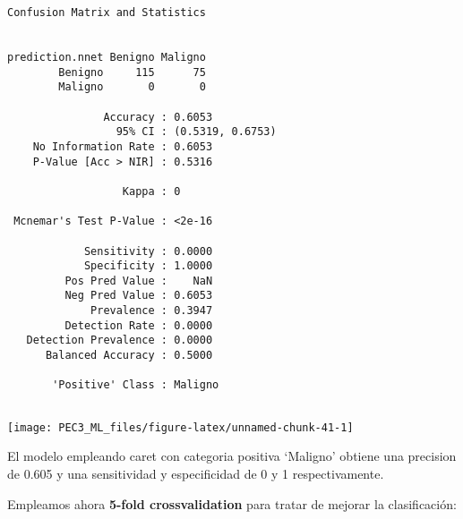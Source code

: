 \documentclass[
]{article}
\begin{document}
\begin{verbatim}
Confusion Matrix and Statistics

               
prediction.nnet Benigno Maligno
        Benigno     115      75
        Maligno       0       0
                                          
               Accuracy : 0.6053          
                 95% CI : (0.5319, 0.6753)
    No Information Rate : 0.6053          
    P-Value [Acc > NIR] : 0.5316          
                                          
                  Kappa : 0               
                                          
 Mcnemar's Test P-Value : <2e-16          
                                          
            Sensitivity : 0.0000          
            Specificity : 1.0000          
         Pos Pred Value :    NaN          
         Neg Pred Value : 0.6053          
             Prevalence : 0.3947          
         Detection Rate : 0.0000          
   Detection Prevalence : 0.0000          
      Balanced Accuracy : 0.5000          
                                          
       'Positive' Class : Maligno         
                                          
\end{verbatim}

\begin{center}\texttt{[image: PEC3\_ML\_files/figure-latex/unnamed-chunk-41-1]} \end{center}

El modelo empleando caret con categoria positiva `Maligno' obtiene una
precision de 0.605 y una sensitividad y especificidad de 0 y 1
respectivamente.

Empleamos ahora \textbf{5-fold crossvalidation} para tratar de mejorar
la clasificación:
\end{document}
